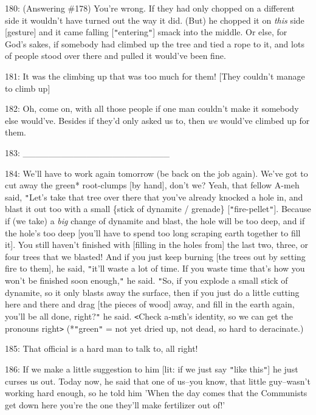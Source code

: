 180: (Answering \#178) You're wrong. If they had only chopped on a different side
it wouldn't have turned out the way it did. (But) he chopped it on \textit{this}
side [gesture] and it came falling [\texttt{"}entering\texttt{"}] smack into the
middle. Or else, for God's sakes, if somebody had climbed up the tree and tied
a rope to it, and lots of people stood over there and pulled it would've been fine.

181: It was the climbing up that was too much for them! [They couldn't manage to
climb up]

182: Oh, come on, with all those people if one man couldn't make it somebody else
would've. Besides if they'd only asked us to, then \textit{we} would've climbed
up for them.

183: \_\_\_\_\_\_\_\_\_\_\_\_\_\_\_\_\_\_\_\_\_\_\_

184: We'll have to work again tomorrow (be back on the job again). We've got to
cut away the green* root-clumps [by hand], don't we? Yeah, that fellow A-meh said,
\texttt{"}Let's take that tree over there that you've already knocked a hole in,
and blast it out too with a small \{stick of dynamite / grenade\} [\texttt{"}fire-pellet\texttt{"}].
Because if (we take) a \textit{big} change of dynamite and blast, the hole will
be too deep, and if the hole's too deep [you'll have to spend too long scraping
earth together to fill it]. You still haven't finished with [filling in the holes
from] the last two, three, or four trees that we blasted! And if you just keep
burning [the trees out by setting fire to them], he said, \texttt{"}it'll waste
a lot of time. If you waste time that's how you won't be finished soon enough,\texttt{"}
he said. \texttt{"}So, if you explode a small stick of dynamite, so it only blasts
away the surface, then if you just do a little cutting here and there and drag
[the pieces of wood] away, and fill in the earth again, you'll be all done, right?\texttt{"}
he said. \texttt{<}Check a-mɛh's identity, so we can get the pronouns right\texttt{>}
(*\texttt{"}green\texttt{"} = not yet dried up, not dead, so hard to deracinate.)

185: That official is a hard man to talk to, all right!

186: If we make a little suggestion to him [lit: if we just say \texttt{"}like
this\texttt{"}] he just curses us out. Today now, he said that one of us--you know,
that little guy--wasn't working hard enough, so he told him 'When the day comes
that the Communists get down here you're the one they'll make fertilizer out of!'

